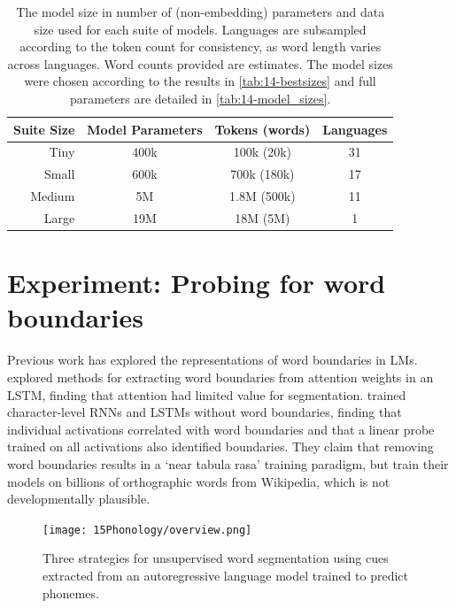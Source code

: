 \setlength{\tabcolsep}{2pt}
\begin{table}[t]
    \centering
    \small
    \begin{tabular}{rccc}
    \toprule
        Suite Size & Model Parameters & Tokens (words) & Languages \\
       \midrule
       Tiny & 400k & 100k (20k) & 31 \\
       Small & 600k & 700k (180k) & 17 \\
       Medium & 5M & 1.8M (500k) & 11 \\
       Large & 19M & 18M (5M) & 1 \\
       \bottomrule
    \end{tabular}
    \caption{The model size in number of (non-embedding) parameters and data size used for each suite of models. Languages are subsampled according to the token count for consistency, as word length varies across languages. Word counts provided are estimates. The model sizes were chosen according to the results in \cref{tab:14-bestsizes} and full parameters are detailed in \cref{tab:14-model_sizes}.}
    \label{tab:15-suites}
\end{table}

\section{Experiment: Probing for word boundaries}\label{sec:15-wordseg}

Previous work has explored the representations of word boundaries in LMs. \citet{sanabria2021difficulty} explored methods for extracting word boundaries from attention weights in an LSTM, finding that attention had limited value for segmentation. \citet{hahn-baroni-2019-tabula} trained character-level RNNs and LSTMs without word boundaries, finding that individual activations correlated with word boundaries and that a linear probe trained on all activations also identified boundaries. They claim that removing word boundaries results in a `near tabula rasa' training paradigm, but train their models on billions of orthographic words from Wikipedia, which is not developmentally plausible.  %

\begin{figure}[t]
    \centering
    \texttt{[image: 15Phonology/overview.png]}
    \caption{Three strategies for unsupervised word segmentation using cues extracted from an autoregressive language model trained to predict phonemes.}
    \label{fig:15-example}
\end{figure}

